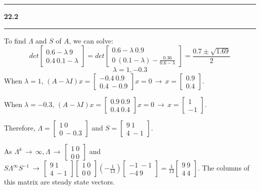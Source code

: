 \documentclass[11pt]{article}
\newcommand\question[2]{\vspace{.25in}\hrule\textbf{#1 #2}\vspace{.5em}\hrule\vspace{.10in}}
\begin{document}
\question{22.2}{}
To find \(\Lambda\) and \(S\) of \(A\), we can solve:
$$det \begin{bmatrix} 0.6-\lambda \ 9 \\ 0.4 \ 0.1-\lambda \end{bmatrix} = det \begin{bmatrix} 0.6-\lambda \ 0.9 \\ 0 \ (0.1-\lambda)-\frac{0.36}{0.6-\lambda}\end{bmatrix}= \frac{0.7 \pm \sqrt{1.69}}{2}$$
$$\lambda = 1, -0.3$$
When \(\lambda = 1\), \((A-\lambda I)x = \begin{bmatrix} -0.4 \ 0.9 \\ 0.4 \ -0.9 \end{bmatrix} x = 0 \,\to\, x = \begin{bmatrix} 0.9 \\ 0.4\end{bmatrix}\).

When \(\lambda = -0.3\), \((A-\lambda I)x = \begin{bmatrix} 0.9 \ 0.9 \\ 0.4 \ 0.4 \end{bmatrix} x = 0 \,\to\, x = \begin{bmatrix} 1 \\ -1 \end{bmatrix}\).

Therefore, \(\Lambda = \begin{bmatrix} 1 \ 0 \\ 0 \ -0.3 \end{bmatrix}\) and \(S = \begin{bmatrix} 9 \ 1 \\ 4 \ -1 \end{bmatrix}\).

As \(\Lambda^k \,\to\, \infty, \Lambda \,\to\, \begin{bmatrix} 1 \ 0 \\ 0 \ 0 \end{bmatrix}\) and \(S\Lambda^{\infty}S^{-1} \,\to\, \begin{bmatrix} 9 \ 1 \\ 4 \ -1 \end{bmatrix}\begin{bmatrix} 1 \ 0 \\ 0 \ 0 \end{bmatrix}(-\frac{1}{13})\begin{bmatrix} -1 \ -1 \\ -4 \ 9 \end{bmatrix} = \frac{1}{13}\begin{bmatrix} 9 \ 9 \\ 4 \ 4 \end{bmatrix}\).
The columns of this matrix are steady state vectors. 
\end{document}
